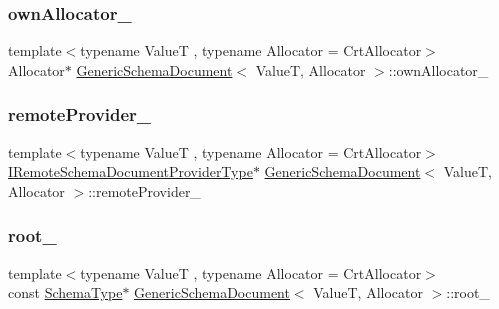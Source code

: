 \mbox{\label{classGenericSchemaDocument_a95ba649b2911b91297321093876f1cab}} 
\subsubsection{\texorpdfstring{own\+Allocator\+\_\+}{ownAllocator\_}}
{\footnotesize\ttfamily template$<$typename ValueT , typename Allocator  = Crt\+Allocator$>$ \\
Allocator$\ast$ \hyperlink{classGenericSchemaDocument}{Generic\+Schema\+Document}$<$ ValueT, Allocator $>$\+::own\+Allocator\+\_\+\hspace{0.3cm}{\ttfamily [private]}}

\mbox{\label{classGenericSchemaDocument_ae71c9925eaf2f51f26ce1083d3f4edf4}} 
\subsubsection{\texorpdfstring{remote\+Provider\+\_\+}{remoteProvider\_}}
{\footnotesize\ttfamily template$<$typename ValueT , typename Allocator  = Crt\+Allocator$>$ \\
\hyperlink{classGenericSchemaDocument_aa53ca323efce50f88aea6fa0d03e9785}{I\+Remote\+Schema\+Document\+Provider\+Type}$\ast$ \hyperlink{classGenericSchemaDocument}{Generic\+Schema\+Document}$<$ ValueT, Allocator $>$\+::remote\+Provider\+\_\+\hspace{0.3cm}{\ttfamily [private]}}

\mbox{\label{classGenericSchemaDocument_a50ee80c40478d090c98900d4e6949737}} 
\subsubsection{\texorpdfstring{root\+\_\+}{root\_}}
{\footnotesize\ttfamily template$<$typename ValueT , typename Allocator  = Crt\+Allocator$>$ \\
const \hyperlink{classGenericSchemaDocument_acaf115202b159a2eb72c97c3dc6c3895}{Schema\+Type}$\ast$ \hyperlink{classGenericSchemaDocument}{Generic\+Schema\+Document}$<$ ValueT, Allocator $>$\+::root\+\_\+\hspace{0.3cm}{\ttfamily [private]}}



